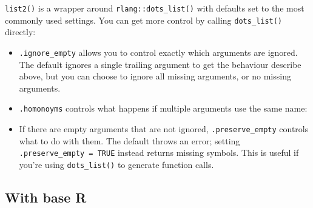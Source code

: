 \documentclass[]{book}
\newenvironment{Shaded}{\begin{snugshade}}{\end{snugshade}}
\newcommand{\CommentTok}[1]{\textcolor[rgb]{0.37,0.37,0.37}{\textit{#1}}}
\newcommand{\DataTypeTok}[1]{\textcolor[rgb]{0.27,0.27,0.27}{#1}}
\newcommand{\DecValTok}[1]{\textcolor[rgb]{0.06,0.06,0.06}{#1}}
\newcommand{\KeywordTok}[1]{\textcolor[rgb]{0.27,0.27,0.27}{\textbf{#1}}}
\newcommand{\NormalTok}[1]{#1}
\newcommand{\StringTok}[1]{\textcolor[rgb]{0.5,0.5,0.5}{#1}}
\begin{document}
\texttt{list2()} is a wrapper around \texttt{rlang::dots\_list()} with defaults set to the most commonly used settings. You can get more control by calling \texttt{dots\_list()} directly:

\begin{itemize}
\item
  \texttt{.ignore\_empty} allows you to control exactly which arguments are ignored.
  The default ignores a single trailing argument to get the behaviour
  describe above, but you can choose to ignore all missing arguments, or
  no missing arguments.
\item
  \texttt{.homonoyms} controls what happens if multiple arguments use the same name:

\begin{Shaded}
\end{Shaded}
\item
  If there are empty arguments that are not ignored, \texttt{.preserve\_empty}
  controls what to do with them. The default throws an error; setting
  \texttt{.preserve\_empty\ =\ TRUE} instead returns missing symbols. This is useful
  if you're using \texttt{dots\_list()} to generate function calls.
\end{itemize}

\hypertarget{do-call}{%
\subsection{With base R}\label{do-call}}
\end{document}
